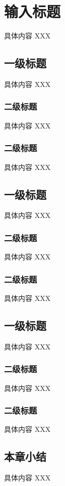 \chapter{输入标题}

具体内容 XXX

\section{一级标题}

具体内容 XXX

\subsection{二级标题}

具体内容 XXX

\subsection{二级标题}

具体内容 XXX

\section{一级标题}

具体内容 XXX

\subsection{二级标题}

具体内容 XXX

\subsection{二级标题}

具体内容 XXX

\section{一级标题}

具体内容 XXX

\subsection{二级标题}

具体内容 XXX

\subsection{二级标题}

具体内容 XXX

\section{本章小结}
具体内容 XXX


